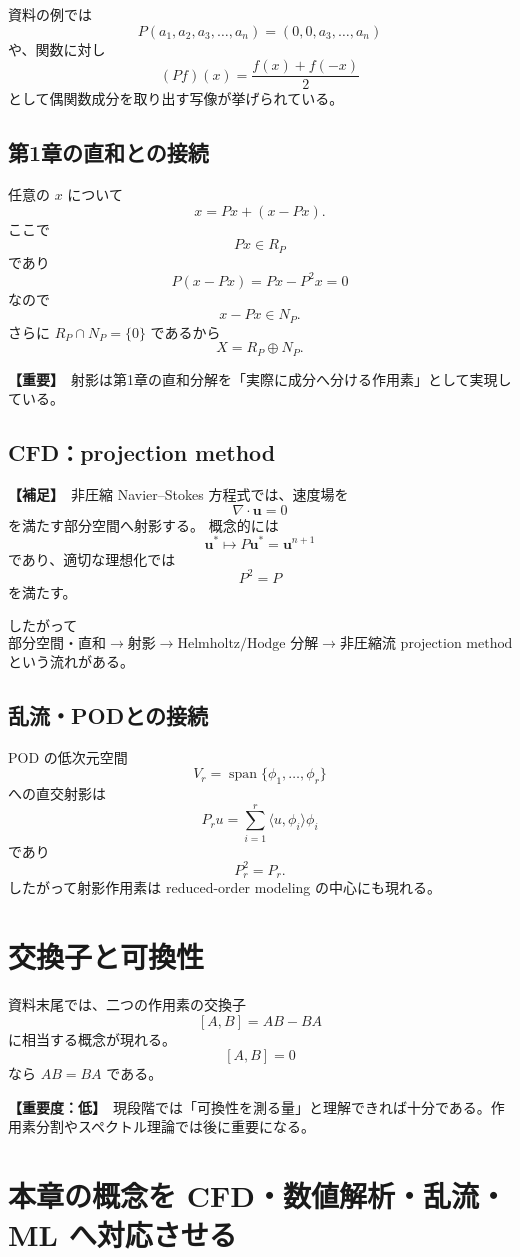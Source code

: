 \documentclass[a4paper,11pt]{ltjsarticle}
\newcommand{\Span}{\operatorname{span}}
\newcommand{\suppitem}{\textbf{【補足】}}
\newcommand{\lowimportance}{\textbf{【重要度：低】}}
\newcommand{\highimportance}{\textbf{【重要】}}
\begin{document}
資料の例では
\[
P(a_1,a_2,a_3,\dots,a_n)
=(0,0,a_3,\dots,a_n)
\]
や、関数に対し
\[
(Pf)(x)=\frac{f(x)+f(-x)}{2}
\]
として偶関数成分を取り出す写像が挙げられている。

\subsection{第1章の直和との接続}
任意の $x$ について
\[
x=Px+(x-Px).
\]
ここで
\[
Px\in R_P
\]
であり
\[
P(x-Px)=Px-P^2x=0
\]
なので
\[
x-Px\in N_P.
\]
さらに $R_P\cap N_P=\{0\}$ であるから
\[
\boxed{X=R_P\oplus N_P.}
\]

\highimportance\ 射影は第1章の直和分解を「実際に成分へ分ける作用素」として実現している。

\subsection{CFD：projection method}
\suppitem\ 非圧縮 Navier--Stokes 方程式では、速度場を
\[
\nabla\cdot\bm u=0
\]
を満たす部分空間へ射影する。
概念的には
\[
\bm u^{*}\mapsto P\bm u^{*}=\bm u^{n+1}
\]
であり、適切な理想化では
\[
P^2=P
\]
を満たす。

したがって
\[
\boxed{
\text{部分空間・直和}
\to
\text{射影}
\to
\text{Helmholtz/Hodge 分解}
\to
\text{非圧縮流 projection method}
}
\]
という流れがある。

\subsection{乱流・PODとの接続}
POD の低次元空間
\[
V_r=\Span\{\phi_1,\dots,\phi_r\}
\]
への直交射影は
\[
P_ru=\sum_{i=1}^{r}\langle u,\phi_i\rangle\phi_i
\]
であり
\[
P_r^2=P_r.
\]
したがって射影作用素は reduced-order modeling の中心にも現れる。

\section{交換子と可換性}

資料末尾では、二つの作用素の交換子
\[
[A,B]=AB-BA
\]
に相当する概念が現れる。
\[
[A,B]=0
\]
なら $AB=BA$ である。

\lowimportance\ 現段階では「可換性を測る量」と理解できれば十分である。作用素分割やスペクトル理論では後に重要になる。

\section{本章の概念を CFD・数値解析・乱流・ML へ対応させる}
\end{document}
